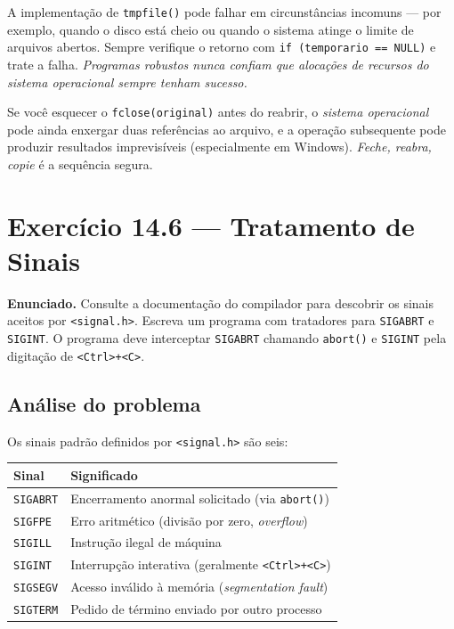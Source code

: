 \documentclass[11pt,a4paper]{article}
\begin{document}
\begin{dicaportab}
A implementa\c{c}\~ao de \texttt{tmpfile()} pode falhar em circunst\^ancias incomuns --- por exemplo, quando o disco est\'a cheio ou quando o sistema atinge o limite de arquivos abertos. Sempre verifique o retorno com \texttt{if (temporario == NULL)} e trate a falha. \emph{Programas robustos nunca confiam que aloca\c{c}\~oes de recursos do sistema operacional sempre tenham sucesso.}
\end{dicaportab}

\begin{errocomum}
Se voc\^e esquecer o \texttt{fclose(original)} antes do reabrir, o \emph{sistema operacional} pode ainda enxergar duas refer\^encias ao arquivo, e a opera\c{c}\~ao subsequente pode produzir resultados imprevis\'iveis (especialmente em Windows). \emph{Feche, reabra, copie} \'e a sequ\^encia segura.
\end{errocomum}

\newpage
\section{Exerc\'icio 14.6 --- Tratamento de Sinais}

\begin{enunciado}
\textbf{Enunciado.} Consulte a documenta\c{c}\~ao do compilador para descobrir os sinais aceitos por \texttt{<signal.h>}. Escreva um programa com tratadores para \texttt{SIGABRT} e \texttt{SIGINT}. O programa deve interceptar \texttt{SIGABRT} chamando \texttt{abort()} e \texttt{SIGINT} pela digita\c{c}\~ao de \texttt{<Ctrl>+<C>}.
\end{enunciado}

\subsection*{An\'alise do problema}

Os sinais padr\~ao definidos por \texttt{<signal.h>} s\~ao seis:

\begin{center}
\renewcommand{\arraystretch}{1.3}
\begin{tabular}{|l|l|}
\hline
\textbf{Sinal} & \textbf{Significado} \\
\hline
\texttt{SIGABRT} & Encerramento anormal solicitado (via \texttt{abort()}) \\
\texttt{SIGFPE}  & Erro aritm\'etico (divis\~ao por zero, \emph{overflow}) \\
\texttt{SIGILL}  & Instru\c{c}\~ao ilegal de m\'aquina \\
\texttt{SIGINT}  & Interrup\c{c}\~ao interativa (geralmente \texttt{<Ctrl>+<C>}) \\
\texttt{SIGSEGV} & Acesso inv\'alido \`a mem\'oria (\emph{segmentation fault}) \\
\texttt{SIGTERM} & Pedido de t\'ermino enviado por outro processo \\
\hline
\end{tabular}
\end{center}
\end{document}
